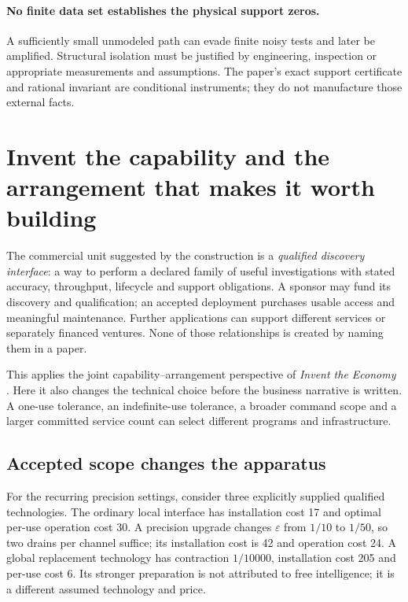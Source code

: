 \documentclass[11pt,letterpaper]{article}
\theoremstyle{definition}\newtheorem{definition}[theorem]{Definition}
\theoremstyle{remark}\newtheorem{remark}[theorem]{Remark}
\begin{document}
\paragraph{No finite data set establishes the physical support zeros.}
A sufficiently small unmodeled path can evade finite noisy tests and later be amplified. Structural isolation must be justified by engineering, inspection or appropriate measurements and assumptions. The paper's exact support certificate and rational invariant are conditional instruments; they do not manufacture those external facts.

\section{Invent the capability and the arrangement that makes it worth building}
\label{sec:economy}
The commercial unit suggested by the construction is a \emph{qualified discovery interface}: a way to perform a declared family of useful investigations with stated accuracy, throughput, lifecycle and support obligations. A sponsor may fund its discovery and qualification; an accepted deployment purchases usable access and meaningful maintenance. Further applications can support different services or separately financed ventures. None of those relationships is created by naming them in a paper.

This applies the joint capability--arrangement perspective of \emph{Invent the Economy} \cite{boucherEconomy}. Here it also changes the technical choice before the business narrative is written. A one-use tolerance, an indefinite-use tolerance, a broader command scope and a larger committed service count can select different programs and infrastructure.

\subsection{Accepted scope changes the apparatus}
For the recurring precision settings, consider three explicitly supplied qualified technologies. The ordinary local interface has installation cost 17 and optimal per-use operation cost 30. A precision upgrade changes $\varepsilon$ from $1/10$ to $1/50$, so two drains per channel suffice; its installation cost is 42 and operation cost 24. A global replacement technology has contraction $1/10000$, installation cost 205 and per-use cost 6. Its stronger preparation is not attributed to free intelligence; it is a different assumed technology and price.
\end{document}
